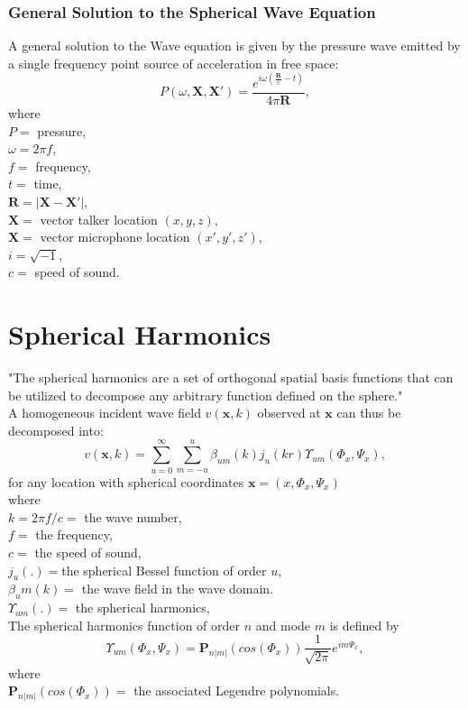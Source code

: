 \subsubsection{General Solution to the Spherical Wave Equation}
A general solution to the Wave equation is given by the pressure wave emitted by a single frequency point source of acceleration in free space\cite{Allen1979}:
\begin{equation}
    P(\omega,\mathbf{X},\mathbf{X'}) = \frac{e^{i\omega(\frac{\mathbf{R}}{c}-t)}}{4\pi \mathbf{R}},
\end{equation}
where\\
$P=$ pressure,\\
$\omega=2\pi f$,\\
$f=$ frequency,\\
$t=$ time,\\
$\mathbf{R}=|\mathbf{X}-\mathbf{X}'|$,\\
$\mathbf{X}=$ vector talker location $(x,y,z)$,\\
$\mathbf{X}=$ vector microphone location $(x',y',z')$,\\
$i=\sqrt{-1}$,\\
$c=$ speed of sound.
\section{Spherical Harmonics}
"The spherical harmonics are a set of orthogonal spatial basis functions that can be utilized
to decompose any arbitrary function defined on the sphere."\cite{Samarasinghe2018}\\
A homogeneous incident wave field $v(\mathbf{x},k)$ observed at $\mathbf{x}$ can thus be decomposed into\cite{Zhang2019}:
\begin{equation}
    v(\mathbf{x},k)=\sum_{u=0}^\infty \sum_{m=-u}^u\beta_{um}(k)j_u(kr)\Upsilon_{um}(\Phi_x,\Psi_x),
\end{equation}
for any location with spherical coordinates $\mathbf{x}=(x,\Phi_x,\Psi_x)$\\
where\\
$k=2\pi f/c=$ the wave number,\\
$f=$ the frequency,\\
$c=$ the speed of sound,\\
$j_u(.)=$the spherical Bessel function of order $u$,\\
$\beta_um(k)=$ the wave field in the wave domain.\\ 
$\Upsilon_{um}(.)=$ the spherical harmonics,\\
The spherical harmonics function of order $n$ and mode $m$ is defined by\cite{Samarasinghe2018}
\begin{equation}
    \Upsilon_{um}(\Phi_x,\Psi_x) = \mathbf{P}_{n|m|}(cos(\Phi_x))\frac{1}{\sqrt{2\pi}}e^{im\Psi_x},
\end{equation}
where\\
$\mathbf{P}_{n|m|}(cos(\Phi_x))=$ the associated Legendre polynomials.
